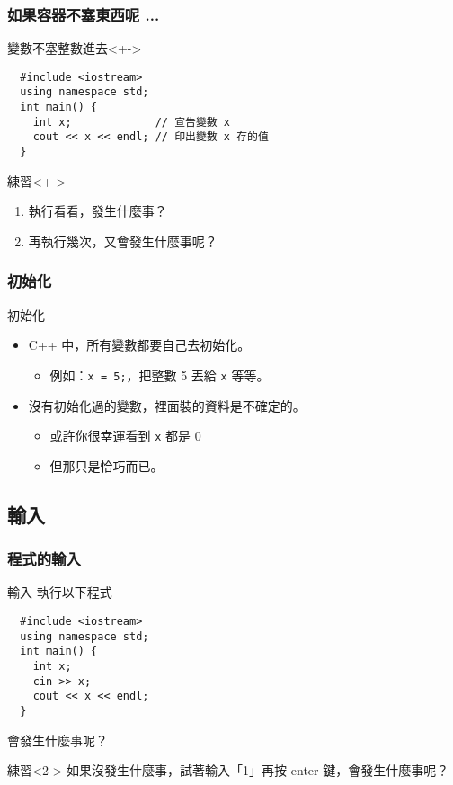 \documentclass[utf8]{beamer}
\begin{document}
\begin{CJK}{UTF8}{bkai}
\begin{frame}[fragile]
  \frametitle{如果容器不塞東西呢 ...}
  \begin{block}{變數不塞整數進去}<+->
    \begin{lstlisting}
  #include <iostream>
  using namespace std;
  int main() {
    int x;             // 宣告變數 x
    cout << x << endl; // 印出變數 x 存的值
  }
    \end{lstlisting}
  \end{block}
  \begin{exampleblock}{練習}<+->
    \begin{enumerate}
    \item 執行看看，發生什麼事？
    \item<+-> 再執行幾次，又會發生什麼事呢？
    \end{enumerate}
  \end{exampleblock}
\end{frame}

\begin{frame}[fragile]
  \frametitle{初始化}
  \begin{alertblock}{初始化}
    \begin{itemize}[<+->]
    \item C++ 中，所有變數都要自己去\alert{初始化}。
      \begin{itemize}
      \item 例如：\lstinline{x = 5;}{}，把整數 5 丟給 \lstinline{x}{} 等等。
      \end{itemize}
    \item 沒有初始化過的變數，裡面裝的資料是\alert{不確定}的。
      \begin{itemize}[<+->]
      \item 或許你很幸運看到 \lstinline{x}{} 都是 0
      \item 但那只是\alert{恰巧}而已。
      \end{itemize}
    \end{itemize}
  \end{alertblock}
\end{frame}

\subsection{輸入}

\begin{frame}[fragile]
  \frametitle{程式的輸入}
  \begin{block}{輸入}
    執行以下程式
    \begin{lstlisting}
  #include <iostream>
  using namespace std;
  int main() {
    int x;
    cin >> x;
    cout << x << endl;
  }
    \end{lstlisting}
    會發生什麼事呢？
  \end{block}
  \begin{exampleblock}{練習}<2->
  如果沒發生什麼事，試著輸入「1」再按 enter 鍵，會發生什麼事呢？
  \end{exampleblock}
\end{frame}


\end{CJK}
\end{document}
